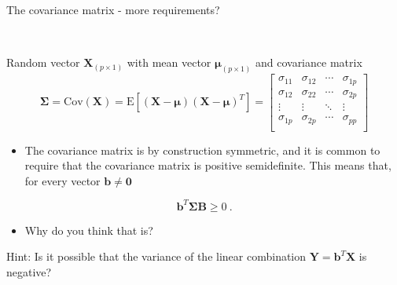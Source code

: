 \documentclass[ignorenonframetext,]{beamer}
\providecommand{\tightlist}{%
  \setlength{\itemsep}{0pt}\setlength{\parskip}{0pt}}
\begin{document}
\begin{frame}

\begin{block}{The covariance matrix - more requirements?}

\(~\)

Random vector \(\mathbf{X}_{(p\times 1)}\) with mean vector
\(\mathbf{\mu}_{(p\times 1)}\) and covariance matrix
\[\mathbf\Sigma=\text{Cov}(\mathbf{X})=\text{E}[(\mathbf{X}-\mathbf{\mu})(\mathbf{X}-\mathbf{\mu})^T]=
\left[ \begin{array}{cccc}
    \sigma_{11} & \sigma_{12} & \cdots & \sigma_{1p}\\
    \sigma_{12} & \sigma_{22} & \cdots & \sigma_{2p}\\
    \vdots & \vdots & \ddots & \vdots\\
    \sigma_{1p} & \sigma_{2p} & \cdots & \sigma_{pp}\\
\end{array} \right]\]

\end{block}

\end{frame}

\begin{frame}

\begin{itemize}
\tightlist
\item
  The covariance matrix is by construction symmetric, and it is common
  to require that the covariance matrix is positive semidefinite. This
  means that, for every vector \(\mathbf{b}\neq \mathbf{0}\)
\end{itemize}

\[\mathbf{b}^T \mathbf{\Sigma} \mathbf{B} \geq 0 \ .\]

\begin{itemize}
\tightlist
\item
  Why do you think that is?
\end{itemize}

Hint: Is it possible that the variance of the linear combination
\(\mathbf{Y}=\mathbf{b}^T\mathbf{X}\) is negative?

\end{frame}
\end{document}
